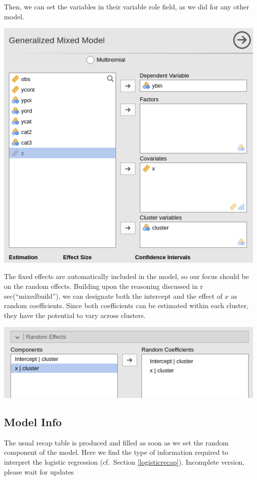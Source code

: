 \documentclass[
]{book}
\begin{document}
Then, we can set the variables in their variable role field, as we did for any other model.

\includegraphics[width=0.8\linewidth]{bookletpics/5_logistic_input2}

The fixed effects are automatically included in the model, so our focus should be on the random effects. Building upon the reasoning discussed in r sec(``mixedbuild''), we can designate both the intercept and the effect of \(x\) as random coefficients. Since both coefficients can be estimated within each cluster, they have the potential to vary across clusters.

\includegraphics[width=0.8\linewidth]{bookletpics/5_logistic_input3}

\hypertarget{model-info}{%
\subsection{Model Info}\label{model-info}}

The usual recap table is produced and filled as soon as we set the random component of the model. Here we find the type of information required to interpret the logistic regression (cf.~Section \ref{logisticrecap}).
{ Incomplete version, please wait for updates }
\end{document}
